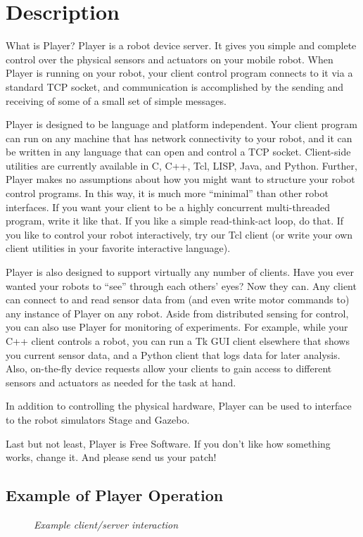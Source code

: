 \documentclass[11pt]{report}
\begin{document}
\section{Description}
What is Player? Player is a robot device server.  It gives you simple
and complete control over the physical sensors and actuators on your
mobile robot.  When Player is running on your robot, your client control
program connects to it via a standard TCP socket, and communication
is accomplished by the sending and receiving of some of a small set of
simple messages.

Player is designed to be language and platform independent.  Your client
program can run on any machine that has network connectivity to your robot,
and it can be written in any language that can open and control a TCP socket.
Client-side utilities are currently available in C, C++, Tcl, LISP, Java,
and Python.  Further, Player makes no assumptions about how you might want
to structure your robot control programs.  In this way, it is much more
``minimal'' than other robot interfaces.  If you want your client to be a
highly concurrent multi-threaded program, write it like that.  If you like
a simple read-think-act loop, do that.  If you like to control your robot
interactively, try our Tcl client (or write your own client utilities in
your favorite interactive language).

Player is also designed to support virtually any number of clients.  Have you
ever wanted your robots to ``see'' through each others' eyes?  Now they can.
Any client can connect to and read sensor data from (and even write motor
commands to) any instance of Player on any robot.  Aside from distributed
sensing for control, you can also use Player for monitoring of experiments.
For example, while your C++ client controls a robot, you can run a Tk GUI
client elsewhere that shows you current sensor data, and a Python client
that logs data for later analysis.  Also, on-the-fly device requests allow
your clients to gain access to different sensors and actuators as needed
for the task at hand.

In addition to controlling the physical hardware, Player can be used to
interface to the robot simulators Stage and Gazebo.

Last but not least, Player is Free Software.  If you don't like how
something works, change it.  And please send us your patch!

\subsection*{Example of Player Operation}
\begin{figure}[ht]
 \centering
  \caption{{\em Example client/server interaction}}
\label{figure:exampleuse}
 \end{figure} 
\end{document}

